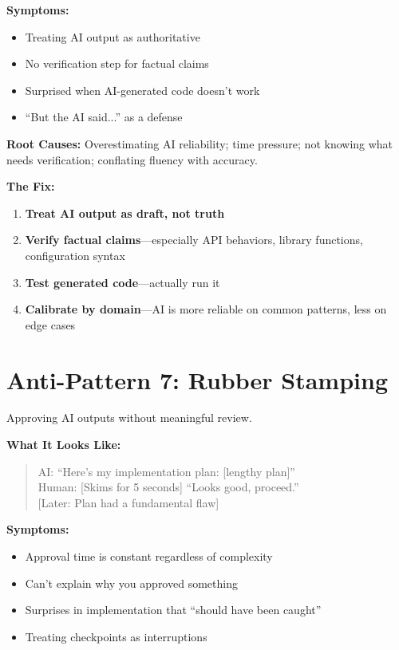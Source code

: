 \textbf{Symptoms:}
\begin{itemize}
    \item Treating AI output as authoritative
    \item No verification step for factual claims
    \item Surprised when AI-generated code doesn't work
    \item ``But the AI said...'' as a defense
\end{itemize}

\textbf{Root Causes:} Overestimating AI reliability; time pressure; not knowing what needs verification; conflating fluency with accuracy.

\textbf{The Fix:}
\begin{enumerate}
    \item \textbf{Treat AI output as draft, not truth}
    \item \textbf{Verify factual claims}---especially API behaviors, library functions, configuration syntax
    \item \textbf{Test generated code}---actually run it
    \item \textbf{Calibrate by domain}---AI is more reliable on common patterns, less on edge cases
\end{enumerate}

\section{Anti-Pattern 7: Rubber Stamping}

Approving AI outputs without meaningful review.

\textbf{What It Looks Like:}

\begin{quote}
AI: ``Here's my implementation plan: [lengthy plan]''\\
Human: [Skims for 5 seconds] ``Looks good, proceed.''\\
{[Later: Plan had a fundamental flaw]}
\end{quote}

\textbf{Symptoms:}
\begin{itemize}
    \item Approval time is constant regardless of complexity
    \item Can't explain why you approved something
    \item Surprises in implementation that ``should have been caught''
    \item Treating checkpoints as interruptions
\end{itemize}

